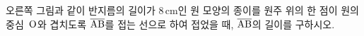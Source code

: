 \noindent\begin{minipage}[t]{0.58\linewidth}\vspace{0pt}\raggedright 오른쪽 그림과 같이 반지름의 길이가 $8\,\mathrm{cm}$인 원 모양의 종이를 원주 위의 한 점이 원의 중심~$\mathrm{O}$와 겹치도록 $\overline{\mathrm{AB}}$를 접는 선으로 하여 접었을 때, $\overline{\mathrm{AB}}$의 길이를 구하시오.\end{minipage}\hfill\begin{minipage}[t]{0.4\linewidth}\vspace{0pt}\centering \resizebox{\ifdim\width>\linewidth\linewidth\else\width\fi}{!}{}\end{minipage}\par
